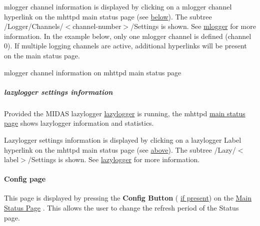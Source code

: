 mlogger channel information is displayed by clicking on a mlogger channel hyperlink on the mhttpd main status page (see \hyperlink{RC_mhttpd_Logger_page_RC_mhttpd_Logger_image}{below}). The subtree /Logger/Channels/$<$channel-\/number$>$/Settings is shown. See \hyperlink{F_Logging}{mlogger} for more information. In the example below, only one mlogger channel is defined (channel 0). If multiple logging channels are active, additional hyperlinks will be present on the main status page. \par
 \label{RC_mhttpd_Logger_page_RC_mhttpd_Logger_image}
\hypertarget{RC_mhttpd_Logger_page_RC_mhttpd_Logger_image}{}
 \begin{center} mlogger channel information on mhttpd main status page \par
\par
\par
  \end{center}  \par


\par


\par
\hypertarget{RC_mhttpd_Logger_page_RC_mhttpd_Logger_lazylogger}{}\subparagraph{lazylogger settings information}\label{RC_mhttpd_Logger_page_RC_mhttpd_Logger_lazylogger}
Provided the MIDAS lazylogger \hyperlink{F_LogUtil_F_lazylogger_utility}{lazylogger} is running, the mhttpd \hyperlink{RC_mhttpd_Logger_page_RC_mhttpd_Logger_image}{main status page} shows lazylogger information and statistics. \par


Lazylogger settings information is displayed by clicking on a lazylogger Label hyperlink on the mhttpd main status page (see \hyperlink{RC_mhttpd_Logger_page_RC_mhttpd_Logger_image}{above}). The subtree /Lazy/$<$label$>$/Settings is shown. See \hyperlink{F_LogUtil_F_lazylogger_utility}{lazylogger} for more information.

 \label{index_end}
\hypertarget{index_end}{}
 \paragraph{Config page}\label{RC_mhttpd_Config_page}


This page is displayed by pressing the {\bfseries Config Button} ( \hyperlink{RC_mhttpd_status_page_features_RC_mhttpd_status_menu_buttons}{if present}) on the \hyperlink{RC_mhttpd_Main_Status_page}{Main Status Page} . This allows the user to change the refresh period of the Status page.

